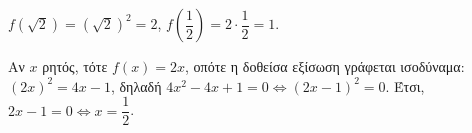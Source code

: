
\begin{alist}
\item $f(\sqrt{2}) = (\sqrt{2})^2 = 2$, $f\left(\dfrac{1}{2}\right) = 2 \cdot \dfrac{1}{2} = 1$.

\item Αν $x$ ρητός, τότε $f(x) = 2x$, οπότε η δοθείσα εξίσωση γράφεται ισοδύναμα:
$(2x)^2 = 4x - 1$, δηλαδή $4x^2 - 4x + 1 = 0 \Leftrightarrow (2x - 1)^2 = 0$. Έτσι, $2x - 1 = 0 \Leftrightarrow x = \dfrac{1}{2}$.
\end{alist}

